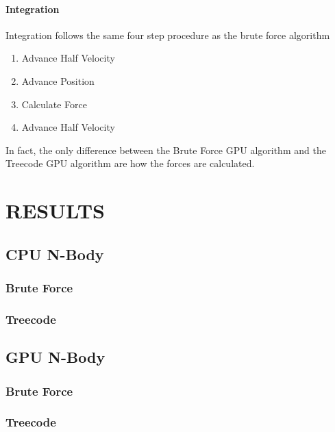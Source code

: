 \documentclass{thesis}
\begin{document}
\subsubsection{Integration}
Integration follows the same four step procedure as the brute force algorithm
\begin{enumerate}
    \item Advance Half Velocity
    \item Advance Position
    \item Calculate Force
    \item Advance Half Velocity
\end{enumerate}
In fact, the only difference between the Brute Force GPU algorithm and the Treecode GPU algorithm are how the forces are calculated. 
\chapter{RESULTS}
\section{CPU N-Body}
\subsection{Brute Force}
\subsection{Treecode}
\section{GPU N-Body}
\subsection{Brute Force}
\subsection{Treecode}
\end{document}
